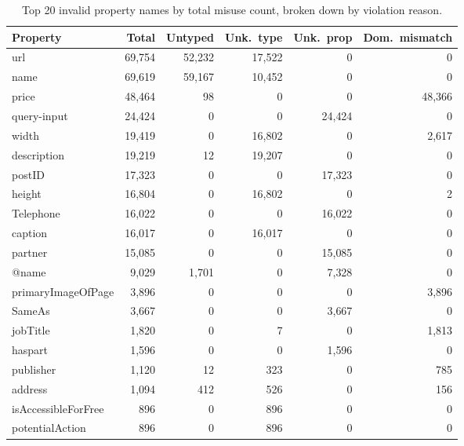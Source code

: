\documentclass[11pt,a4paper]{article}
\begin{document}
\begin{table}[H]
\centering
\caption{Top 20 invalid property names by total misuse count, broken down by violation reason.}
\label{tab:invalid_props}
\begin{tabular}{lrrrrr}
\toprule
\textbf{Property} & \textbf{Total} & \textbf{Untyped} & \textbf{Unk.\ type} & \textbf{Unk.\ prop} & \textbf{Dom.\ mismatch} \\
\midrule
url                &  69{,}754 &  52{,}232 &  17{,}522 &       0 &          0 \\
name               &  69{,}619 &  59{,}167 &  10{,}452 &       0 &          0 \\
price              &  48{,}464 &      98   &       0   &       0 &  48{,}366 \\
query-input        &  24{,}424 &       0   &       0   &  24{,}424 &        0 \\
width              &  19{,}419 &       0   &  16{,}802 &       0 &   2{,}617 \\
description        &  19{,}219 &      12   &  19{,}207 &       0 &          0 \\
postID             &  17{,}323 &       0   &       0   &  17{,}323 &        0 \\
height             &  16{,}804 &       0   &  16{,}802 &       0 &          2 \\
Telephone          &  16{,}022 &       0   &       0   &  16{,}022 &        0 \\
caption            &  16{,}017 &       0   &  16{,}017 &       0 &          0 \\
partner            &  15{,}085 &       0   &       0   &  15{,}085 &        0 \\
@name              &   9{,}029 &   1{,}701 &       0   &   7{,}328 &        0 \\
primaryImageOfPage &   3{,}896 &       0   &       0   &       0 &   3{,}896 \\
SameAs             &   3{,}667 &       0   &       0   &   3{,}667 &        0 \\
jobTitle           &   1{,}820 &       0   &       7   &       0 &   1{,}813 \\
haspart            &   1{,}596 &       0   &       0   &   1{,}596 &        0 \\
publisher          &   1{,}120 &      12   &     323   &       0 &      785 \\
address            &   1{,}094 &     412   &     526   &       0 &      156 \\
isAccessibleForFree&     896   &       0   &     896   &       0 &          0 \\
potentialAction    &     896   &       0   &     896   &       0 &          0 \\
\bottomrule
\end{tabular}
\end{table}
\end{document}
